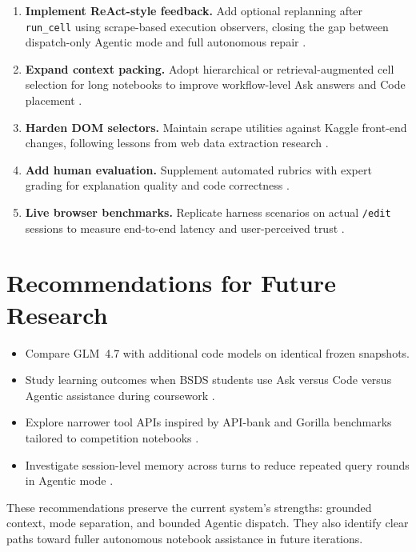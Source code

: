 \begin{enumerate}
  \item \textbf{Implement ReAct-style feedback.} Add optional replanning after \texttt{run\_cell} using scrape-based execution observers, closing the gap between dispatch-only Agentic mode and full autonomous repair \parencite{yao2023react,shinn2023reflexion}.
  \item \textbf{Expand context packing.} Adopt hierarchical or retrieval-augmented cell selection for long notebooks to improve workflow-level Ask answers and Code placement \parencite{lewis2020rag,jiang2023structgpt}.
  \item \textbf{Harden DOM selectors.} Maintain scrape utilities against Kaggle front-end changes, following lessons from web data extraction research \parencite{chasins2018roussillon}.
  \item \textbf{Add human evaluation.} Supplement automated rubrics with expert grading for explanation quality and code correctness \parencite{chen2021codex,wang2021welldocumented}.
  \item \textbf{Live browser benchmarks.} Replicate harness scenarios on actual \texttt{/edit} sessions to measure end-to-end latency and user-perceived trust \parencite{mozannar2024reading}.
\end{enumerate}

\section{Recommendations for Future Research}

\begin{itemize}
  \item Compare GLM~4.7 with additional code models \parencite{openai2023gpt4,brown2020language} on identical frozen snapshots.
  \item Study learning outcomes when \acf{BSDS} students use Ask versus Code versus Agentic assistance during coursework \parencite{finnieansley2022codex}.
  \item Explore narrower tool APIs inspired by API-bank and Gorilla benchmarks \parencite{li2023apibank,patil2023gorilla} tailored to competition notebooks \parencite{quaranta2022bestpractices}.
  \item Investigate session-level memory across turns to reduce repeated query rounds in Agentic mode \parencite{park2023generative}.
\end{itemize}

These recommendations preserve the current system's strengths: grounded context, mode separation, and bounded Agentic dispatch. They also identify clear paths toward fuller autonomous notebook assistance in future iterations.

